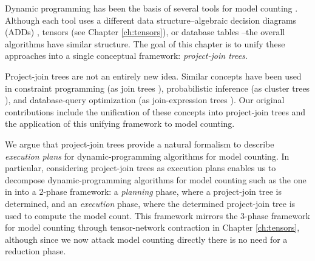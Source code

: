 

Dynamic programming has been the basis of several tools for model counting \cite{DPV20,DDV19,dudek2020parallel,fichte2020exploiting}.
Although each tool uses a different data structure--algebraic decision diagrams (ADDs) \cite{DPV20}, tensors (see Chapter \ref{ch:tensors}), or database tables \cite{fichte2020exploiting}--the overall algorithms have similar structure.
The goal of this chapter is to unify these approaches into a single conceptual framework: \emph{project-join trees}.

Project-join trees are not an entirely new idea.
Similar concepts have been used in constraint programming (as join trees \cite{dechter1989tree}), probabilistic inference (as cluster trees \cite{SAS94}), and database-query optimization (as join-expression trees \cite{MPPV04}).
Our original contributions include the unification of these concepts into project-join trees and the application of this unifying framework to model counting.

We argue that project-join trees provide a natural formalism to describe \emph{execution plans} for dynamic-programming algorithms for model counting.
In particular, considering project-join trees as execution plans enables us to decompose dynamic-programming algorithms for model counting such as the one in  \cite{DPV20,phan2019weighted} into a 2-phase framework: a \emph{planning} phase, where a project-join tree is determined, and an \emph{execution} phase, where the determined project-join tree is used to compute the model count.
This framework mirrors the 3-phase framework for model counting through tensor-network contraction in Chapter \ref{ch:tensors}, although since we now attack model counting directly there is no need for a reduction phase.

